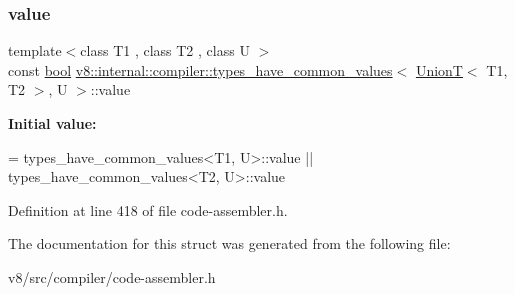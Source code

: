 \subsubsection{\texorpdfstring{value}{value}}
{\footnotesize\ttfamily template$<$class T1 , class T2 , class U $>$ \\
const \mbox{\hyperlink{classbool}{bool}} \mbox{\hyperlink{structv8_1_1internal_1_1compiler_1_1types__have__common__values}{v8\+::internal\+::compiler\+::types\+\_\+have\+\_\+common\+\_\+values}}$<$ \mbox{\hyperlink{structv8_1_1internal_1_1UnionT}{UnionT}}$<$ T1, T2 $>$, U $>$\+::value\hspace{0.3cm}{\ttfamily [static]}}

{\bfseries Initial value\+:}
\begin{DoxyCode}
= types\_have\_common\_values<T1, U>::value ||
                            types\_have\_common\_values<T2, U>::value
\end{DoxyCode}


Definition at line 418 of file code-\/assembler.\+h.



The documentation for this struct was generated from the following file\+:\begin{DoxyCompactItemize}
\item 
v8/src/compiler/code-\/assembler.\+h\end{DoxyCompactItemize}
